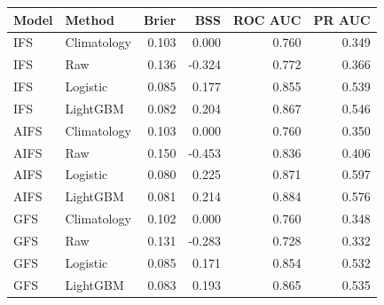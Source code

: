 \begin{tabular}{llrrrr}
\toprule
Model & Method & Brier & BSS & ROC AUC & PR AUC \\
\midrule
IFS & Climatology & 0.103 & 0.000 & 0.760 & 0.349 \\
IFS & Raw & 0.136 & -0.324 & 0.772 & 0.366 \\
IFS & Logistic & 0.085 & 0.177 & 0.855 & 0.539 \\
IFS & LightGBM & 0.082 & 0.204 & 0.867 & 0.546 \\
\midrule
AIFS & Climatology & 0.103 & 0.000 & 0.760 & 0.350 \\
AIFS & Raw & 0.150 & -0.453 & 0.836 & 0.406 \\
AIFS & Logistic & 0.080 & 0.225 & 0.871 & 0.597 \\
AIFS & LightGBM & 0.081 & 0.214 & 0.884 & 0.576 \\
\midrule
GFS & Climatology & 0.102 & 0.000 & 0.760 & 0.348 \\
GFS & Raw & 0.131 & -0.283 & 0.728 & 0.332 \\
GFS & Logistic & 0.085 & 0.171 & 0.854 & 0.532 \\
GFS & LightGBM & 0.083 & 0.193 & 0.865 & 0.535 \\
\bottomrule
\end{tabular}